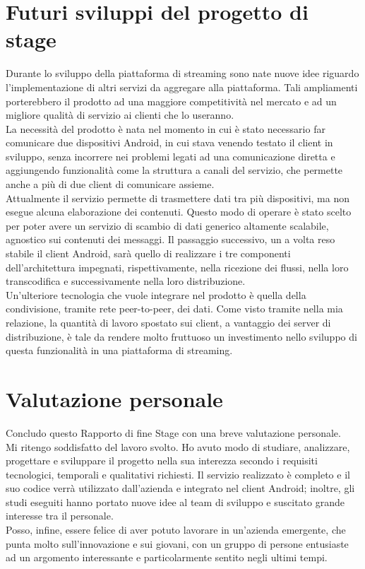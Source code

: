 \section{Futuri sviluppi del progetto di stage}
Durante lo sviluppo della piattaforma di streaming sono nate nuove idee riguardo l'implementazione di altri servizi da aggregare alla piattaforma. Tali ampliamenti porterebbero il prodotto ad una maggiore competitività nel mercato e ad un migliore qualità di servizio ai clienti che lo useranno.
\\
La necessità del prodotto è nata nel momento in cui è stato necessario far comunicare due dispositivi Android, in cui stava venendo testato il client in sviluppo, senza incorrere nei problemi legati ad una comunicazione diretta e aggiungendo funzionalità come la struttura a canali del servizio, che permette anche a più di due client di comunicare assieme.
\\
Attualmente il servizio permette di trasmettere dati tra più dispositivi, ma non esegue alcuna elaborazione dei contenuti. Questo modo di operare è stato scelto per poter avere un servizio di scambio di dati generico altamente scalabile, agnostico sui contenuti dei messaggi. Il passaggio successivo, un a volta reso stabile il client Android, sarà quello di realizzare i tre componenti dell'architettura impegnati, rispettivamente, nella ricezione dei flussi, nella loro transcodifica e successivamente nella loro distribuzione.
\\
Un'ulteriore tecnologia che \nomeAzienda{} vuole integrare nel prodotto è quella della condivisione, tramite rete peer-to-peer, dei dati. Come visto tramite nella mia relazione, la quantità di lavoro spostato sui client, a vantaggio dei server di distribuzione, è tale da rendere molto fruttuoso un investimento nello sviluppo di questa funzionalità in una piattaforma di streaming.

\section{Valutazione personale}
Concludo questo Rapporto di fine Stage con una breve valutazione personale.
\\
Mi ritengo soddisfatto del lavoro svolto. Ho avuto modo di studiare, analizzare, progettare e sviluppare il progetto nella sua interezza secondo i requisiti tecnologici, temporali e qualitativi richiesti. Il servizio realizzato è completo e il suo codice verrà utilizzato dall'azienda e integrato nel client Android; inoltre, gli studi eseguiti hanno portato nuove idee al team di sviluppo e suscitato grande interesse tra il personale.
\\
Posso, infine, essere felice di aver potuto lavorare in un'azienda emergente, che punta molto sull'innovazione e sui giovani, con un gruppo di persone entusiaste ad un argomento interessante e particolarmente sentito negli ultimi tempi.